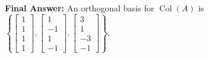 \documentclass[11pt, letterpaper]{article}
\theoremstyle{definition}
\theoremstyle{remark}
\begin{document}
\textbf{Final Answer:} An orthogonal basis for $\operatorname{Col}(A)$ is $\left\{ \begin{bmatrix} 1 \\ 1 \\ 1 \\ 1 \end{bmatrix}, \begin{bmatrix} 1 \\ -1 \\ 1 \\ -1 \end{bmatrix}, \begin{bmatrix} 3 \\ 1 \\ -3 \\ -1 \end{bmatrix} \right\}$.

\vspace{0.8em}
\end{document}
